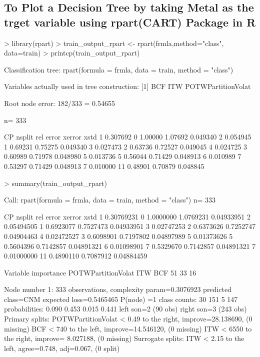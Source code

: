 \documentclass{article}
\begin{document}
\subsection*{To Plot a Decision Tree by taking Metal as the trget variable using rpart(CART) Package in R }
\begin{Schunk}
\begin{Sinput}
> library(rpart)
> train_output_rpart <- rpart(frmla,method="class", data=train)
> printcp(train_output_rpart)
\end{Sinput}
\begin{Soutput}
Classification tree:
rpart(formula = frmla, data = train, method = "class")

Variables actually used in tree construction:
[1] BCF                ITW                POTWPartitionVolat

Root node error: 182/333 = 0.54655

n= 333 

        CP nsplit rel error  xerror     xstd
1 0.307692      0   1.00000 1.07692 0.049340
2 0.054945      1   0.69231 0.75275 0.049340
3 0.027473      2   0.63736 0.72527 0.049045
4 0.024725      3   0.60989 0.71978 0.048980
5 0.013736      5   0.56044 0.71429 0.048913
6 0.010989      7   0.53297 0.71429 0.048913
7 0.010000     11   0.48901 0.70879 0.048845
\end{Soutput}
\begin{Sinput}
> summary(train_output_rpart)
\end{Sinput}
\begin{Soutput}
Call:
rpart(formula = frmla, data = train, method = "class")
  n= 333 

          CP nsplit rel error    xerror       xstd
1 0.30769231      0 1.0000000 1.0769231 0.04933951
2 0.05494505      1 0.6923077 0.7527473 0.04933951
3 0.02747253      2 0.6373626 0.7252747 0.04904463
4 0.02472527      3 0.6098901 0.7197802 0.04897989
5 0.01373626      5 0.5604396 0.7142857 0.04891321
6 0.01098901      7 0.5329670 0.7142857 0.04891321
7 0.01000000     11 0.4890110 0.7087912 0.04884459

Variable importance
POTWPartitionVolat                ITW                BCF 
                51                 33                 16 

Node number 1: 333 observations,    complexity param=0.3076923
  predicted class=CNM  expected loss=0.5465465  P(node) =1
    class counts:    30   151     5   147
   probabilities: 0.090 0.453 0.015 0.441 
  left son=2 (90 obs) right son=3 (243 obs)
  Primary splits:
      POTWPartitionVolat < 0.49   to the right, improve=28.138690, (0 missing)
      BCF                < 740    to the left,  improve=14.546120, (0 missing)
      ITW                < 6550   to the right, improve= 8.027188, (0 missing)
  Surrogate splits:
      ITW < 2.15   to the left,  agree=0.748, adj=0.067, (0 split)


\end{Soutput}
\end{Schunk}
\end{document}
